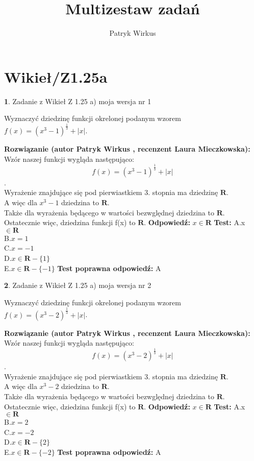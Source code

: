 \documentclass[12pt, a4paper]{article}
\title{Multizestaw zadań}
\author{Patryk Wirkus}
\date{}
\theoremstyle{definition} %
\newtheorem{zad}{}
\newcommand{\kategoria}[1]{\section{#1}}
\newcommand{\zadStart}[1]{\begin{zad}#1\newline}
\newcommand{\zadStop}{\end{zad}}
\newcommand{\rozwStart}[2]{\noindent \textbf{Rozwiązanie (autor #1 , recenzent #2): }\newline}
\newcommand{\rozwStop}{\newline}
\newcommand{\odpStart}{\noindent \textbf{Odpowiedź:}\newline}
\newcommand{\odpStop}{\newline}
\newcommand{\testStart}{\noindent \textbf{Test:}\newline}
\newcommand{\testStop}{\newline}
\newcommand{\kluczStart}{\noindent \textbf{Test poprawna odpowiedź:}\newline}
\newcommand{\kluczStop}{\newline}
\begin{document}
\maketitle

\kategoria{Wikieł/Z1.25a}


\zadStart{Zadanie z Wikieł Z 1.25 a) moja wersja nr 1}

Wyznaczyć dziedzinę funkcji okrelonej podanym wzorem $f(x) = (x^{3}-1)^{\frac{1}{3}} + |x|$.
\zadStop
\rozwStart{Patryk Wirkus}{Laura Mieczkowska}
Wzór naszej funkcji wygląda następująco:
$$f(x) = (x^{3}-1)^{\frac{1}{3}} + |x|$$.\\
Wyrażenie znajdujące się pod pierwiastkiem 3. stopnia ma dziedzinę $\mathbf{R}$.\\ A więc dla $x^{3}-1$ dziedzina to $\mathbf{R}$.\\ Także dla wyrażenia będącego w wartości bezwględnej dziedzina to $\mathbf{R}$.\\
Ostatecznie więc, dziedzina funkcji f(x) to $\mathbf{R}$.
\rozwStop
\odpStart
$x \in \mathbf{R}$
\odpStop
\testStart
A.x $\in \mathbf{R}$\\ B.$x = 1$\\ C.$x = -1$\\ D.$x \in \mathbf{R} - \{1\}$\\ E.$x \in \mathbf{R} - \{-1\}$
\testStop
\kluczStart
A
\kluczStop



\zadStart{Zadanie z Wikieł Z 1.25 a) moja wersja nr 2}

Wyznaczyć dziedzinę funkcji okrelonej podanym wzorem $f(x) = (x^{3}-2)^{\frac{1}{3}} + |x|$.
\zadStop
\rozwStart{Patryk Wirkus}{Laura Mieczkowska}
Wzór naszej funkcji wygląda następująco:
$$f(x) = (x^{3}-2)^{\frac{1}{3}} + |x|$$.\\
Wyrażenie znajdujące się pod pierwiastkiem 3. stopnia ma dziedzinę $\mathbf{R}$.\\ A więc dla $x^{3}-2$ dziedzina to $\mathbf{R}$.\\ Także dla wyrażenia będącego w wartości bezwględnej dziedzina to $\mathbf{R}$.\\
Ostatecznie więc, dziedzina funkcji f(x) to $\mathbf{R}$.
\rozwStop
\odpStart
$x \in \mathbf{R}$
\odpStop
\testStart
A.x $\in \mathbf{R}$\\ B.$x = 2$\\ C.$x = -2$\\ D.$x \in \mathbf{R} - \{2\}$\\ E.$x \in \mathbf{R} - \{-2\}$
\testStop
\kluczStart
A
\kluczStop
\end{document}
